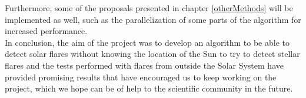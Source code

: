 Furthermore, some of the proposals presented in chapter \ref{otherMethods} will be implemented as well, such as the parallelization of some parts of the algorithm for increased performance. \\

In conclusion, the aim of the project was to develop an algorithm to be able to detect solar flares without knowing the location of the Sun to try to detect stellar flares and the tests performed with flares from outside the Solar System have provided promising results that have encouraged us to keep working on the project, which we hope can be of help to the scientific community in the future.



